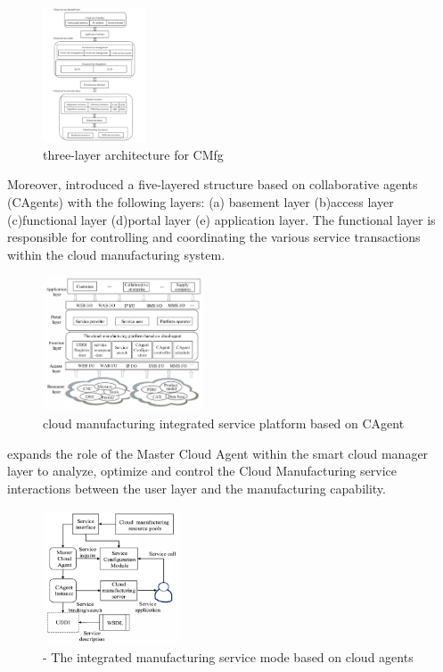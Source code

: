 \begin{figure}[h]
    \centering
    \includegraphics[height=4cm, keepaspectratio]{images/ding-three-layer-architecture}
    \caption{\textcite{xu_cloud_2012} three-layer architecture for CMfg}
    \label{fig:ding-3-layer-architecture}
\end{figure}

Moreover, \textcite{wei_jiang_research_2012} introduced a five-layered structure based on collaborative agents (CAgents) with the following layers: (a) basement layer (b)access layer (c)functional layer (d)portal layer (e) application layer. The functional layer is responsible for controlling and coordinating the various service transactions within the cloud manufacturing system.

\begin{figure}[h]
    \centering
    \includegraphics[height=4cm, keepaspectratio]{images/jiang-cloud-mfg}
    \caption{\textcite{wei_jiang_research_2012} cloud manufacturing integrated service platform based on CAgent}
    \label{fig:jiang-architecture}
\end{figure}

\textcite{li_icms_2013} expands the role of the Master Cloud Agent within the smart cloud manager layer to analyze, optimize and control the Cloud Manufacturing service interactions between the user layer and the manufacturing capability.

\begin{figure}[h]
    \centering
    \includegraphics[height=4cm, keepaspectratio]{images/wang-integrated-mfg-services}
    \caption{\textcite{li_icms_2013} - The integrated manufacturing service mode based on cloud agents}
    \label{fig:ding-3-layer-architecture}
\end{figure}

